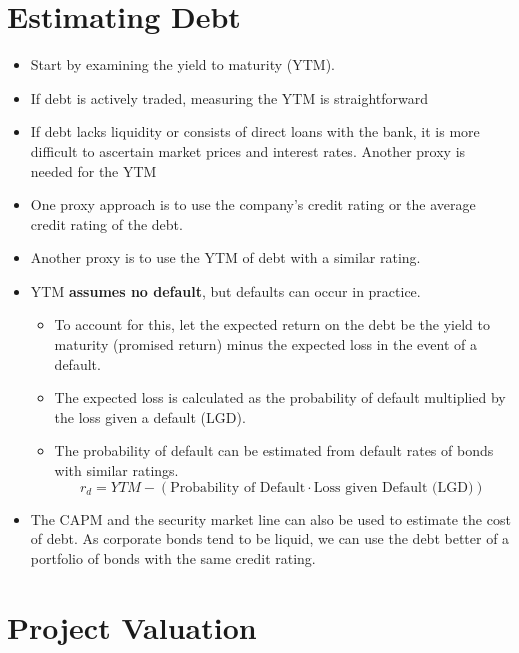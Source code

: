 \section{Estimating Debt}
\begin{itemize}
    \item Start by examining the yield to maturity (YTM).
    \item If debt is actively traded, measuring the YTM is straightforward
    \item If debt lacks liquidity or consists of direct loans with the bank, it is more difficult to ascertain market prices and interest rates. Another proxy is needed for the YTM
    \item One proxy approach is to use the company's credit rating or the average credit rating of the debt. 
    \item Another proxy is to use the YTM of debt with a similar rating.
    \item YTM \textbf{assumes no default}, but defaults can occur in practice. 
    \begin{itemize}
        \item To account for this, let the expected return on the debt be the yield to maturity (promised return) minus the expected loss in the event of a default.
        \item The expected loss is calculated as the probability of default multiplied by the loss given a default (LGD).
        \item The probability of default can be estimated from default rates of bonds with similar ratings.
        \begin{equation}
            r_d = YTM - (\text{Probability of Default} \cdot \text{Loss given Default (LGD)})
        \end{equation}
    \end{itemize}
    \item The CAPM and the security market line can also be used to estimate the cost of debt. As corporate bonds tend to be liquid, we can use the debt better of a portfolio of bonds with the same credit rating.
\end{itemize}

\section{Project Valuation}



